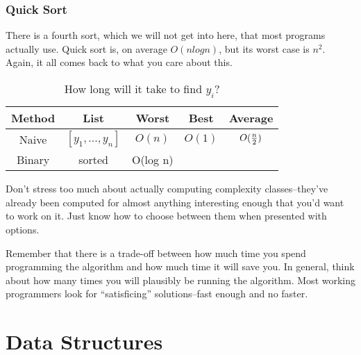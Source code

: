 \documentclass[12pt,letter]{article}
\begin{document}
\subsubsection{Quick Sort}
There is a fourth sort, which we will not get into here, that most
programs actually use. Quick sort is, on average $O (n log n)$, but
its worst case is $n^2$. Again, it all comes back to what you care
about this.


\begin{table}
\begin{center}
\caption{How long will it take to find $y_i$?}
\begin{tabular}{ccccc}
Method & List & Worst & Best & Average \\
\hline
Naive & $[y_1, ..., y_n]$ & $O(n) $ & $O(1)$ & $O({n\over2})$ \\
Binary & sorted & O(log n) & \\
\end{tabular}
\end{center}
\end{table}

Don't stress too much about actually computing complexity
classes--they've already been computed for almost anything interesting
enough that you'd want to work on it. Just know how to choose between
them when presented with options. 

Remember that there is a trade-off between how much time you spend
programming the algorithm and how much time it will save you. In
general, think about how many times you will plausibly be running the
algorithm. Most working programmers look for ``satisficing''
solutions--fast enough and no faster. 
 



\section{Data Structures}
\end{document}
